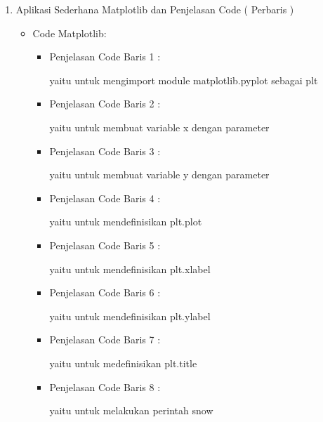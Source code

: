 \begin{enumerate}
\par
\par
\item Aplikasi Sederhana Matplotlib dan Penjelasan Code ( Perbaris )
\begin{itemize}
\item Code Matplotlib:
\par
\begin{itemize}
\item Penjelasan Code Baris 1 :
\par yaitu untuk mengimport module matplotlib.pyplot sebagai plt 
\item Penjelasan Code Baris 2 :
\par yaitu untuk membuat variable x dengan parameter
\item Penjelasan Code Baris 3 :
\par yaitu untuk membuat variable y dengan parameter 
\item Penjelasan Code Baris 4 :
\par yaitu untuk mendefinisikan plt.plot 
\item Penjelasan Code Baris 5 :
\par yaitu untuk mendefinisikan plt.xlabel 
\item Penjelasan Code Baris 6 :
\par yaitu untuk mendefinisikan plt.ylabel
\item Penjelasan Code Baris 7 :
\par yaitu untuk medefinisikan plt.title
\item Penjelasan Code Baris 8 :
\par yaitu untuk melakukan perintah snow
\end{itemize}
\end{itemize}


\end{enumerate}
